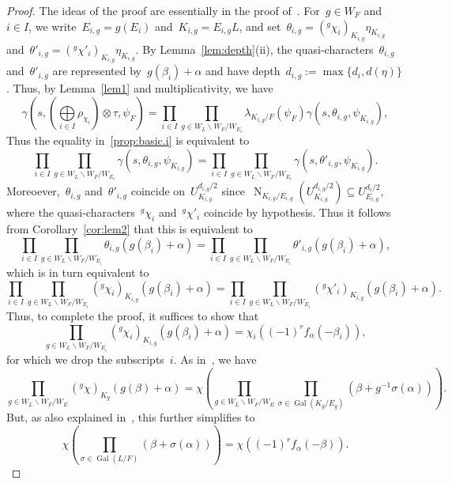 \documentclass[12pt]{amsart}
\newcommand{\Gal}{\operatorname{Gal}}
\newcommand{\N}{\operatorname{N}}
\begin{document}
\begin{proof}
The ideas of the proof are essentially in the proof of~\cite[Theorem~3.2]{A22}. For~$g\in W_F$ and~$i\in I$, we write~$E_{i,g}=g(E_i)$ and~$K_{i,g}=E_{i,g}L$, and set~$\theta_{i,g}=({}^g\chi_i)_{K_{i,g}} \eta_{K_{i,g}}$ and~$\theta'_{i,g}=({}^g\chi'_i)_{K_{i,g}} \eta_{K_{i,g}}$. By Lemma~\ref{lem:depth}(ii), the quasi-characters~$\theta_{i,g}$ and~$\theta'_{i,g}$ are represented by~$g(\beta_i)+\alpha$ and have depth~$d_{i,g}:=\max\{d_i,d(\eta)\}$. Thus, by Lemma~\ref{lem1} and multiplicativity, we have
\[
\gamma(s,({\textstyle\bigoplus\limits_{i\in I}\rho_{\chi_i}})\otimes\tau,\psi_F)= \prod_{i\in I} \prod_{g\in W_L\backslash W_F/W_{E_i}}
\lambda_{K_{i,g}/F}(\psi_F)\gamma(s,\theta_{i,g}, \psi_{K_{i,g}}),
\]
Thus the equality in~\ref{prop:basic.i} is equivalent to
\[
\prod_{i\in I} \prod_{g\in W_L\backslash W_F/W_{E_i}} \gamma(s,\theta_{i,g}, \psi_{K_{i,g}}) = \prod_{i\in I} \prod_{g\in W_L\backslash W_F/W_{E_i}} \gamma(s,\theta'_{i,g}, \psi_{K_{i,g}}).
\]
Moreoever,~$\theta_{i,g}$ and~$\theta'_{i,g}$ coincide on~$U^{d_{i,g}/2}_{K_{i,g}}$ since~$\N_{K_{i,g}/E_{i,g}}(U^{d_{i,g}/2}_{K_{i,g}})\subseteq U^{d_i/2}_{E_{i,g}}$, where the quasi-characters~${}^g\chi_i$ and~${}^g\chi'_i$ coincide by hypothesis. Thus it follows from Corollary~\ref{cor:lem2} that this is equivalent to
\[
\prod_{i\in I} \prod_{g\in W_L\backslash W_F/W_{E_i}} \theta_{i,g} (g(\beta_i)+\alpha) = 
\prod_{i\in I} \prod_{g\in W_L\backslash W_F/W_{E_i}} \theta'_{i,g} (g(\beta_i)+\alpha),
\]
which is in turn equivalent to
\[
\prod_{i\in I} \prod_{g\in W_L\backslash W_F/W_{E_i}} ({}^g\chi_i)_{K_{i,g}} (g(\beta_i)+\alpha) = 
\prod_{i\in I} \prod_{g\in W_L\backslash W_F/W_{E_i}} ({}^g\chi'_i)_{K_{i,g}} (g(\beta_i)+\alpha).
\]
Thus, to complete the proof, it suffices to show that
\[
\prod_{g\in W_L\backslash W_F/W_{E_i}} ({}^g\chi_i)_{K_{i,g}} (g(\beta_i)+\alpha) = \chi_i((-1)^r f_\alpha(-\beta_i)),
\]
for which we drop the subscripts~$i$. As in~\cite[after~(4.3)]{A22}, we have
\[
\prod_{g\in W_L\backslash W_F/W_E} ({}^g\chi)_{K_{g}} (g(\beta)+\alpha) = \chi\left( \prod_{g\in W_L\backslash W_F/W_E} \prod_{\sigma\in\Gal(K_g/E_g)}(\beta+g^{-1}\sigma(\alpha))\right).
\]
But, as also explained in~\cite{A22}, this further simplifies to
\[
\chi\left(\prod_{\sigma\in\Gal(L/F)}(\beta+\sigma(\alpha))\right) = \chi((-1)^r f_\alpha(-\beta)).
\]
\end{proof}
\end{document}
